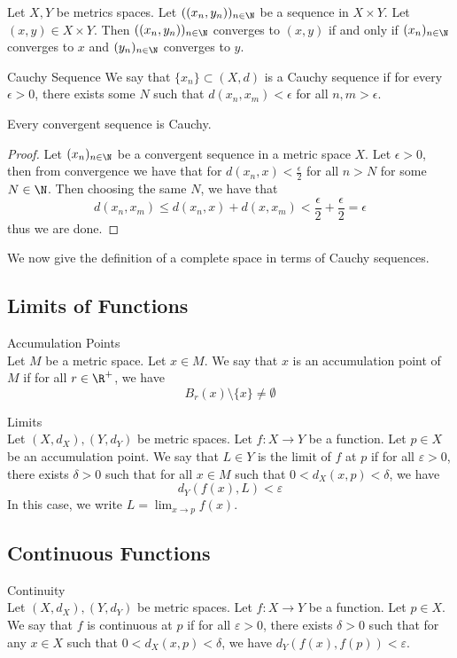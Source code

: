 \documentclass[a4paper]{article}
\begin{document}
\begin{prp}{}{} Let $X,Y$ be metrics spaces. Let $((x_n,y_n))_{n\in\N}$ be a sequence in $X\times Y$. Let $(x,y)\in X\times Y$. Then $((x_n,y_n))_{n\in\N}$ converges to $(x,y)$ if and only if $(x_n)_{n\in\N}$ converges to $x$ and $(y_n)_{n\in\N}$ converges to $y$. 
\end{prp}

\begin{defn}{Cauchy Sequence}{} We say that $\{x_n\}\subset(X,d)$ is a Cauchy sequence if for every $\epsilon>0$, there exists some $N$ such that $d(x_n,x_m)<\epsilon$ for all $n,m>\epsilon$. 
\end{defn}

\begin{prp}{}{} Every convergent sequence is Cauchy. 
\begin{proof}
Let $(x_n)_{n\in\N}$ be a convergent sequence in a metric space $X$. Let $\epsilon>0$, then from convergence we have that for $d(x_n,x)<\frac{\epsilon}{2}$ for all $n>N$ for some $N\in\N$. Then choosing the same $N$, we have that $$d(x_n,x_m)\leq d(x_n,x)+d(x,x_m)<\frac{\epsilon}{2}+\frac{\epsilon}{2}=\epsilon$$ thus we are done. 
\end{proof}
\end{prp}

We now give the definition of a complete space in terms of Cauchy sequences. 

\subsection{Limits of Functions}
\begin{defn}{Accumulation Points}{}\\
Let $M$ be a metric space. Let $x\in M$. We say that $x$ is an accumulation point of $M$ if for all $r\in\R^+$, we have $$B_r(x)\setminus\{x\}\neq\emptyset$$
\end{defn}

\begin{defn}{Limits}{}\\
Let $(X,d_X),(Y,d_Y)$ be metric spaces. Let $f:X\to Y$ be a function. Let $p\in X$ be an accumulation point. We say that $L\in Y$ is the limit of $f$ at $p$ if for all $\varepsilon>0$, there exists $\delta>0$ such that for all $x\in M$ such that $0<d_X(x,p)<\delta$, we have $$d_Y(f(x),L)<\varepsilon$$ In this case, we write $L=\lim_{x\to p}f(x)$. 
\end{defn}

\subsection{Continuous Functions}
\begin{defn}{Continuity}{}\\
Let $(X,d_X),(Y,d_Y)$ be metric spaces. Let $f:X\to Y$ be a function. Let $p\in X$. We say that $f$ is continuous at $p$ if for all $\varepsilon>0$, there exists $\delta>0$ such that for any $x\in X$ such that $0<d_X(x,p)<\delta$, we have $d_Y(f(x),f(p))<\varepsilon$. 
\end{defn}
\end{document}
